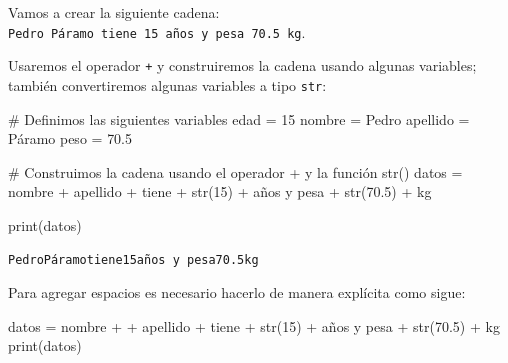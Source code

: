 \documentclass[
  spanish,
  letterpaper,
]{scrbook}
\newenvironment{Shaded}{\begin{snugshade}}{\end{snugshade}}
\newcommand{\BuiltInTok}[1]{\textcolor[rgb]{0.00,0.23,0.31}{#1}}
\newcommand{\CommentTok}[1]{\textcolor[rgb]{0.37,0.37,0.37}{#1}}
\newcommand{\DecValTok}[1]{\textcolor[rgb]{0.68,0.00,0.00}{#1}}
\newcommand{\FloatTok}[1]{\textcolor[rgb]{0.68,0.00,0.00}{#1}}
\newcommand{\NormalTok}[1]{\textcolor[rgb]{0.00,0.23,0.31}{#1}}
\newcommand{\OperatorTok}[1]{\textcolor[rgb]{0.37,0.37,0.37}{#1}}
\newcommand{\StringTok}[1]{\textcolor[rgb]{0.13,0.47,0.30}{#1}}
\theoremstyle{definition}
\theoremstyle{remark}
\begin{document}
Vamos a crear la siguiente cadena:
\texttt{Pedro\ Páramo\ tiene\ 15\ años\ y\ pesa\ 70.5\ kg}.

Usaremos el operador \texttt{+} y construiremos la cadena usando algunas
variables; también convertiremos algunas variables a tipo \texttt{str}:

\begin{Shaded}
\begin{Highlighting}[]
\CommentTok{\# Definimos las siguientes variables}
\NormalTok{edad }\OperatorTok{=} \DecValTok{15}
\NormalTok{nombre }\OperatorTok{=} \StringTok{\textquotesingle{}Pedro\textquotesingle{}}
\NormalTok{apellido }\OperatorTok{=} \StringTok{\textquotesingle{}Páramo\textquotesingle{}}
\NormalTok{peso }\OperatorTok{=} \FloatTok{70.5}

\CommentTok{\# Construimos la cadena usando el operador \textquotesingle{}+\textquotesingle{} y la función \textquotesingle{}str()\textquotesingle{} }
\NormalTok{datos }\OperatorTok{=}\NormalTok{ nombre }\OperatorTok{+}\NormalTok{ apellido }\OperatorTok{+} \StringTok{\textquotesingle{}tiene\textquotesingle{}} \OperatorTok{+} \BuiltInTok{str}\NormalTok{(}\DecValTok{15}\NormalTok{) }\OperatorTok{+} \StringTok{\textquotesingle{}años y pesa\textquotesingle{}} \OperatorTok{+} \BuiltInTok{str}\NormalTok{(}\FloatTok{70.5}\NormalTok{) }\OperatorTok{+} \StringTok{\textquotesingle{}kg\textquotesingle{}}

\BuiltInTok{print}\NormalTok{(datos)}
\end{Highlighting}
\end{Shaded}

\begin{verbatim}
PedroPáramotiene15años y pesa70.5kg
\end{verbatim}

Para agregar espacios es necesario hacerlo de manera explícita como
sigue:

\begin{Shaded}
\begin{Highlighting}[]
\NormalTok{datos }\OperatorTok{=}\NormalTok{ nombre }\OperatorTok{+} \StringTok{\textquotesingle{} \textquotesingle{}} \OperatorTok{+}\NormalTok{ apellido }\OperatorTok{+} \StringTok{\textquotesingle{} tiene \textquotesingle{}} \OperatorTok{+} \BuiltInTok{str}\NormalTok{(}\DecValTok{15}\NormalTok{) }\OperatorTok{+} \StringTok{\textquotesingle{} años y pesa \textquotesingle{}} \OperatorTok{+} \BuiltInTok{str}\NormalTok{(}\FloatTok{70.5}\NormalTok{) }\OperatorTok{+} \StringTok{\textquotesingle{} kg\textquotesingle{}}
\BuiltInTok{print}\NormalTok{(datos)}
\end{Highlighting}
\end{Shaded}
\end{document}
